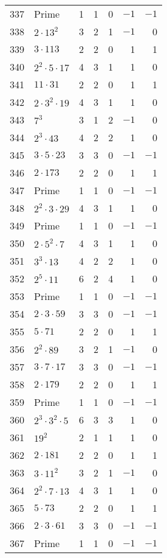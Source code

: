 \documentclass[12pt]{article}
\begin{document}
\begin{tabular}{|r|l|r|r|r|r|r|}
337 & Prime & 1 & 1 & 0 & $-1$ & $-1$ \\
338 & $2 \cdot 13^2$ & 3 & 2 & 1 & $-1$ & 0 \\
339 & $3 \cdot 113$ & 2 & 2 & 0 & 1 & 1 \\
340 & $2^2 \cdot 5 \cdot 17$ & 4 & 3 & 1 & 1 & 0 \\
341 & $11 \cdot 31$ & 2 & 2 & 0 & 1 & 1 \\
342 & $2 \cdot 3^2 \cdot 19$ & 4 & 3 & 1 & 1 & 0 \\
343 & $7^3$ & 3 & 1 & 2 & $-1$ & 0 \\
344 & $2^3 \cdot 43$ & 4 & 2 & 2 & 1 & 0 \\
345 & $3 \cdot 5 \cdot 23$ & 3 & 3 & 0 & $-1$ & $-1$ \\
346 & $2 \cdot 173$ & 2 & 2 & 0 & 1 & 1 \\
347 & Prime & 1 & 1 & 0 & $-1$ & $-1$ \\
348 & $2^2 \cdot 3 \cdot 29$ & 4 & 3 & 1 & 1 & 0 \\
349 & Prime & 1 & 1 & 0 & $-1$ & $-1$ \\
350 & $2 \cdot 5^2 \cdot 7$ & 4 & 3 & 1 & 1 & 0 \\
351 & $3^3 \cdot 13$ & 4 & 2 & 2 & 1 & 0 \\
352 & $2^5 \cdot 11$ & 6 & 2 & 4 & 1 & 0 \\
353 & Prime & 1 & 1 & 0 & $-1$ & $-1$ \\
354 & $2 \cdot 3 \cdot 59$ & 3 & 3 & 0 & $-1$ & $-1$ \\
355 & $5 \cdot 71$ & 2 & 2 & 0 & 1 & 1 \\
356 & $2^2 \cdot 89$ & 3 & 2 & 1 & $-1$ & 0 \\
357 & $3 \cdot 7 \cdot 17$ & 3 & 3 & 0 & $-1$ & $-1$ \\
358 & $2 \cdot 179$ & 2 & 2 & 0 & 1 & 1 \\
359 & Prime & 1 & 1 & 0 & $-1$ & $-1$ \\
360 & $2^3 \cdot 3^2 \cdot 5$ & 6 & 3 & 3 & 1 & 0 \\
361 & $19^2$ & 2 & 1 & 1 & 1 & 0 \\
362 & $2 \cdot 181$ & 2 & 2 & 0 & 1 & 1 \\
363 & $3 \cdot 11^2$ & 3 & 2 & 1 & $-1$ & 0 \\
364 & $2^2 \cdot 7 \cdot 13$ & 4 & 3 & 1 & 1 & 0 \\
365 & $5 \cdot 73$ & 2 & 2 & 0 & 1 & 1 \\
366 & $2 \cdot 3 \cdot 61$ & 3 & 3 & 0 & $-1$ & $-1$ \\
367 & Prime & 1 & 1 & 0 & $-1$ & $-1$ \\

\end{tabular}
\end{document}
